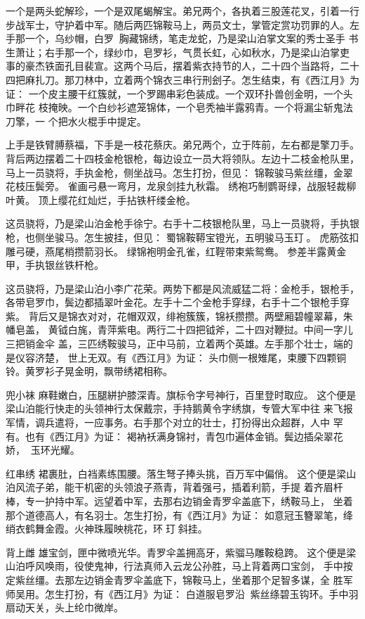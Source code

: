 一个是两头蛇解珍，一个是双尾蝎解宝。弟兄两个，各执着三股莲花叉，引着一行
步战军士，守护着中军。随后两匹锦鞍马上，两员文士，掌管定赏功罚罪的人。左
手那一个，乌纱帽，白罗，胸藏锦绣，笔走龙蛇，乃是梁山泊掌文案的秀士圣手
书生萧让；右手那一个，绿纱巾，皂罗衫，气贯长虹，心如秋水，乃是梁山泊掌吏
事的豪杰铁面孔目裴宣。这两个马后，摆着紫衣持节的人，二十四个当路将，二十
四把麻扎刀。那刀林中，立着两个锦衣三串行刑刽子。怎生结束，有《西江月》为
证：
一个皮主腰干红簇就，一个罗踢串彩色装成。一个双环扑兽创金明，一个头巾畔花
枝掩映。一个白纱衫遮笼锦体，一个皂秃袖半露鸦青。一个将漏尘斩鬼法刀擎，一
个把水火棍手中提定。

上手是铁臂膊蔡福，下手是一枝花蔡庆。弟兄两个，立于阵前，左右都是擎刀手。
背后两边摆着二十四枝金枪银枪，每边设立一员大将领队。左边十二枝金枪队里，
马上一员骁将，手执金枪，侧坐战马。怎生打扮，但见：
锦鞍骏马紫丝缰，金翠花枝压鬓旁。
雀画弓悬一弯月，龙泉剑挂九秋霜。
绣袍巧制鹦哥绿，战服轻裁柳叶黄。
顶上缨花红灿烂，手拈铁杆缕金枪。

这员骁将，乃是梁山泊金枪手徐宁。右手十二枝银枪队里，马上一员骁将，手执银
枪，也侧坐骏马。怎生披挂，但见：
蜀锦鞍鞯宝镫光，五明骏马玉玎。
虎筋弦扣雕弓硬，燕尾梢攒箭羽长。
绿锦袍明金孔雀，红鞓带束紫鸳鸯。
参差半露黄金甲，手执银丝铁杆枪。

这员骁将，乃是梁山泊小李广花荣。两势下都是风流威猛二将：金枪手，银枪手，
各带皂罗巾，鬓边都插翠叶金花。左手十二个金枪手穿绿，右手十二个银枪手穿紫。
背后又是锦衣对对，花帽双双，绯袍簇簇，锦袄攒攒。两壁厢碧幢翠幕，朱幡皂盖，
黄钺白旄，青萍紫电。两行二十四把钺斧，二十四对鞭挝。中间一字儿三把销金伞
盖，三匹绣鞍骏马，正中马前，立着两个英雄。左手那个壮士，端的是仪容济楚，
世上无双。有《西江月》为证：
头巾侧一根雉尾，束腰下四颗铜铃。黄罗衫子晃金明，飘带绣裙相称。

兜小袜
麻鞋嫩白，压腿絣护膝深青。旗标令字号神行，百里登时取应。
这个便是梁山泊能行快走的头领神行太保戴宗，手持鹅黄令字绣旗，专管大军中往
来飞报军情，调兵遣将，一应事务。右手那个对立的壮士，打扮得出众超群，人中
罕有。也有《西江月》为证：
褐衲袄满身锦衬，青包巾遍体金销。鬓边插朵翠花娇，玉环光耀。

红串绣
裙裹肚，白裆素练围腰。落生弩子捧头挑，百万军中偏俏。
这个便是梁山泊风流子弟，能干机密的头领浪子燕青，背着强弓，插着利箭，手提
着齐眉杆棒，专一护持中军。远望着中军，去那右边销金青罗伞盖底下，绣鞍马上，
坐着那个道德高人，有名羽士。怎生打扮，有《西江月》为证：
如意冠玉簪翠笔，绛绡衣鹤舞金霞。火神珠履映桃花，环玎斜挂。

背上雌
雄宝剑，匣中微喷光华。青罗伞盖拥高牙，紫骝马雕鞍稳跨。
这个便是梁山泊呼风唤雨，役使鬼神，行法真师入云龙公孙胜，马上背着两口宝剑，
手中按定紫丝缰。去那左边销金青罗伞盖底下，锦鞍马上，坐着那个足智多谋，全
胜军师吴用。怎生打扮，有《西江月》为证：
白道服皂罗沿，紫丝绦碧玉钩环。手中羽扇动天关，头上纶巾微岸。

